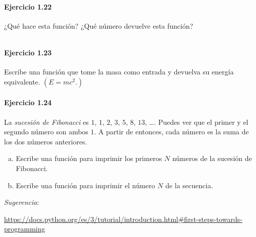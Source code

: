 \begin{listing}[ht!]
	\inputminted{python}{1.21.py}
\end{listing}

\paragraph{\color{DarkBlue}Ejercicio 1.22}
¿Qué hace esta función? ¿Qué número devuelve esta función?

\begin{listing}[ht!]
	\inputminted{python}{1.22.py}
\end{listing}

\paragraph{\color{DarkBlue}Ejercicio 1.23}
Escribe una función que tome la masa como entrada y devuelva su
energía equivalente.
$\left(E = mc^{2}.\right)$

\paragraph{\color{DarkBlue}Ejercicio 1.24}
La \emph{sucesión de Fibonacci} es $1$, $1$, $2$, $3$, $5$, $8$,
$13$, \ldots.
Puedes ver que el primer y el segundo número son ambos $1$.
A partir de entonces, cada número es la suma de los dos números
anteriores.
\begin{enumerate}[(a)]
	\item

	      Escribe una función para imprimir los primeros $N$ números
	      de la sucesión de Fibonacci.

	\item

	      Escribe una función para imprimir el número $N$ de la
	      secuencia.

\end{enumerate}

\emph{Sugerencia}:

\url{https://docs.python.org/es/3/tutorial/introduction.html#first-steps-towards-programming}


